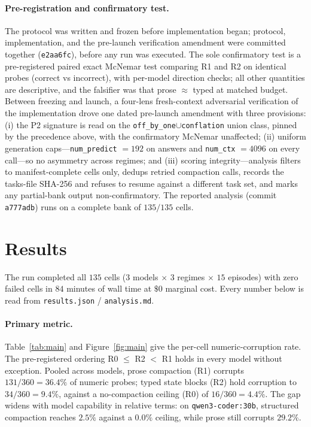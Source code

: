 \documentclass[11pt]{article}
\begin{document}
\paragraph{Pre-registration and confirmatory test.}
The protocol was written and frozen before implementation began; protocol,
implementation, and the pre-launch verification amendment were committed
together (\texttt{e2aa6fc}), before any run was executed.
The sole confirmatory test is a pre-registered paired
exact McNemar test comparing R1 and R2 on identical probes (correct vs
incorrect), with per-model direction checks; all other quantities are
descriptive, and the falsifier was that prose $\approx$ typed at matched
budget. Between freezing and launch, a four-lens fresh-context adversarial
verification of the implementation drove one dated pre-launch amendment with
three provisions: (i) the P2 signature is read on the
\texttt{off\_by\_one}$\cup$\texttt{conflation} union class, pinned by the
precedence above, with the confirmatory McNemar unaffected; (ii) uniform
generation caps---\texttt{num\_predict} $=192$ on answers and
\texttt{num\_ctx} $=4096$ on every call---so no asymmetry across regimes; and
(iii) scoring integrity---analysis filters to manifest-complete cells only,
dedups retried compaction calls, records the tasks-file SHA-256 and refuses to
resume against a different task set, and marks any partial-bank output
non-confirmatory. The reported analysis (commit \texttt{a777adb}) runs on a
complete bank of $135/135$ cells.

\section{Results}
\label{sec:results}

The run completed all $135$ cells ($3$ models $\times$ $3$ regimes $\times$
$15$ episodes) with zero failed cells in $84$ minutes of wall time at $\$0$
marginal cost. Every number below is read from \texttt{results.json} /
\texttt{analysis.md}.

\paragraph{Primary metric.}
Table~\ref{tab:main} and Figure~\ref{fig:main} give the per-cell
numeric-corruption rate. The pre-registered ordering R0 $\le$ R2 $<$ R1 holds
in every model without exception. Pooled across models, prose compaction (R1)
corrupts $131/360 = 36.4\%$ of numeric probes; typed state blocks (R2) hold
corruption to $34/360 = 9.4\%$, against a no-compaction ceiling (R0) of
$16/360 = 4.4\%$. The gap widens with model capability in relative terms: on
\texttt{qwen3-coder:30b}, structured compaction reaches $2.5\%$ against a
$0.0\%$ ceiling, while prose still corrupts $29.2\%$.
\end{document}
